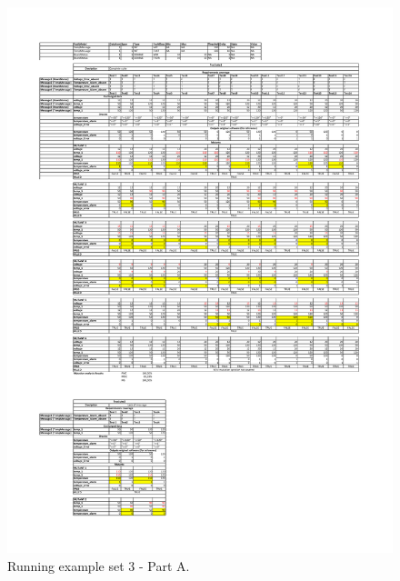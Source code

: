 \begin{figure}[tb]
\centering
\includegraphics[width=18cm]{damat/DataDrivenExample3A}
\caption{Running example set 3 - Part A.}
\label{fig:damat:RunningExample3A}
\end{figure}

